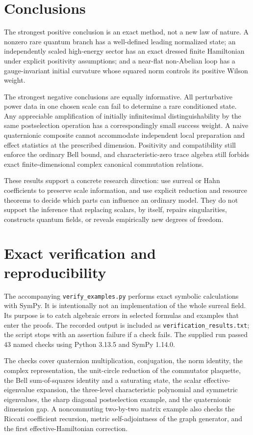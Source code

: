 \documentclass[11pt,oneside]{article}
\numberwithin{equation}{section}
\theoremstyle{plain}
\theoremstyle{definition}
\theoremstyle{remark}
\begin{document}
\section{Conclusions}
The strongest positive conclusion is an exact method, not a new law of nature. A nonzero rare quantum branch has a well-defined leading normalized state; an independently scaled high-energy sector has an exact dressed finite Hamiltonian under explicit positivity assumptions; and a near-flat non-Abelian loop has a gauge-invariant initial curvature whose squared norm controls its positive Wilson weight.

The strongest negative conclusions are equally informative. All perturbative power data in one chosen scale can fail to determine a rare conditioned state. Any appreciable amplification of initially infinitesimal distinguishability by the same postselection operation has a correspondingly small success weight. A naive quaternionic composite cannot accommodate independent local preparation and effect statistics at the prescribed dimension. Positivity and compatibility still enforce the ordinary Bell bound, and characteristic-zero trace algebra still forbids exact finite-dimensional complex canonical commutation relations.

These results support a concrete research direction: use surreal or Hahn coefficients to preserve scale information, and use explicit reduction and resource theorems to decide which parts can influence an ordinary model. They do not support the inference that replacing scalars, by itself, repairs singularities, constructs quantum fields, or reveals empirically new degrees of freedom.

\appendix
\section{Exact verification and reproducibility}\label{app:verification}

The accompanying \texttt{verify\_examples.py} performs exact symbolic calculations with SymPy. It is intentionally not an implementation of the whole surreal field. Its purpose is to catch algebraic errors in selected formulas and examples that enter the proofs. The recorded output is included as \texttt{verification\_results.txt}; the script stops with an assertion failure if a check fails. The supplied run passed 43 named checks using Python 3.13.5 and SymPy 1.14.0.

The checks cover quaternion multiplication, conjugation, the norm identity, the complex representation, the unit-circle reduction of the commutator plaquette, the Bell sum-of-squares identity and a saturating state, the scalar effective-eigenvalue expansion, the three-level characteristic polynomial and symmetric eigenvalues, the sharp diagonal postselection example, and the quaternionic dimension gap. A noncommuting two-by-two matrix example also checks the Riccati coefficient recursion, metric self-adjointness of the graph generator, and the first effective-Hamiltonian correction.
\end{document}
